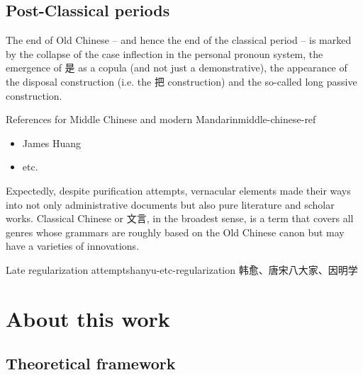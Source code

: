 \documentclass[UTF8, a4paper, oneside, scheme=plain, 12pt]{ctexrep}
\begin{document}
\subsection{Post-Classical periods}

The end of Old Chinese -- and hence the end of the classical period --
is marked by the collapse of the case inflection in the personal pronoun system,
the emergence of 是 as a copula (and not just a demonstrative),
the appearance of the disposal construction (i.e. the 把 construction)
and the so-called long passive construction.

\begin{todobox}{References for Middle Chinese and modern Mandarin}{middle-chinese-ref}
    \begin{itemize}
        \item James Huang
        \item etc.
    \end{itemize}
\end{todobox}

Expectedly, despite purification attempts,
vernacular elements made their ways into not only administrative documents
but also pure literature and scholar works.
Classical Chinese or 文言, in the broadest sense,
is a term that covers all genres whose grammars are roughly based on the Old Chinese canon
but may have a varieties of innovations.

\begin{todobox}{Late regularization attempts}{hanyu-etc-regularization}
    韩愈、唐宋八大家、因明学
\end{todobox}

\section{About this work}

\subsection{Theoretical framework}\label{sec:intro.theory}
\end{document}

